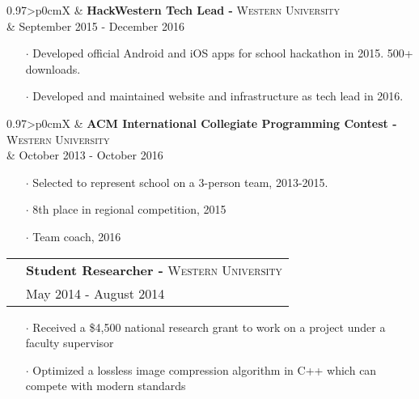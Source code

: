 \documentclass[letterpaper, oneside, final]{scrartcl} %
\newcommand{\gray}{\rowcolor[gray]{.90}} %
\begin{document}
\begin{center}
\vspace{-0.05cm}

\begin{tabularx}{0.97\linewidth}{>{\raggedleft\scshape}p{0cm}X}
\gray & \textbf{HackWestern Tech Lead -} \textsc{Western University}\\
\gray & {September 2015 - December 2016}\\
\end{tabularx}
\vspace{-0.1cm}
\begin{itemize} \itemsep-0.2cm
\item[$\cdot$] Developed official Android and iOS apps for school hackathon in 2015. 500+ downloads. \\
\item[$\cdot$] Developed and maintained website and infrastructure as tech lead in 2016.
\end{itemize}

\vspace{-0.05cm}

\begin{tabularx}{0.97\linewidth}{>{\raggedleft\scshape}p{0cm}X}
\gray & \textbf{ACM International Collegiate Programming Contest -} \textsc{Western University}\\
\gray & {October 2013 - October 2016}\	\
\end{tabularx}
\vspace{-0.1cm}
\begin{itemize} \itemsep-0.2cm
\item[$\cdot$] Selected to represent school on a 3-person team, 2013-2015. \\
\item[$\cdot$] 8th place in regional competition, 2015 \\
\item[$\cdot$] Team coach, 2016 \\
\end{itemize}

\vspace{-0.05cm}

\begin{tabularx}{0.97\linewidth}{>{\raggedleft\scshape}p{0cm}X}
\gray & \textbf{Student Researcher -} \textsc{Western University}\\
\gray & {May 2014 - August 2014}\\
\end{tabularx}
\vspace{-0.1cm}
\begin{itemize}\itemsep-0.2cm
\item[$\cdot$] Received a \$4,500 national research grant to work on a project under a faculty supervisor
\item[$\cdot$] Optimized a lossless image compression algorithm in C++ which can compete with modern standards\\
\end{itemize}


\end{center}
\end{document}
